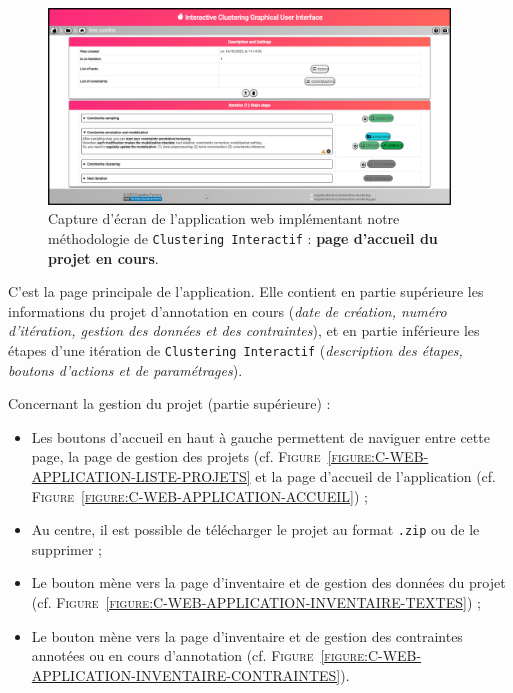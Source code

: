 		\begin{figure}[H]
			\centering
			\includegraphics[width=0.95\textwidth]{figures/interactive-clustering-application-accueil-projet}
			\caption{
				Capture d'écran de l'application web implémentant notre méthodologie de \texttt{Clustering Interactif} : \textbf{page d'accueil du projet en cours}.
			}
			\label{figure:C-WEB-APPLICATION-ACCUEIL-PROJET}
		\end{figure}
		
		C'est la page principale de l'application. Elle contient en partie supérieure les informations du projet d'annotation en cours (\textit{date de création, numéro d'itération, gestion des données et des contraintes}), et en partie inférieure les étapes d'une itération de \texttt{Clustering Interactif} (\textit{description des étapes, boutons d'actions et de paramétrages}).
		
		Concernant la gestion du projet (partie supérieure) :
		\begin{itemize}
			\item Les boutons d'accueil en haut à gauche permettent de naviguer entre cette page, la page de gestion des projets (cf. \textsc{Figure~\ref{figure:C-WEB-APPLICATION-LISTE-PROJETS}} et la page d'accueil de l'application (cf. \textsc{Figure~\ref{figure:C-WEB-APPLICATION-ACCUEIL}}) ;
			\item Au centre, il est possible de télécharger le projet au format \texttt{.zip} ou de le supprimer ;
			\item Le bouton  mène vers la page d'inventaire et de gestion des données du projet (cf. \textsc{Figure~\ref{figure:C-WEB-APPLICATION-INVENTAIRE-TEXTES}}) ;
			\item Le bouton  mène vers la page d'inventaire et de gestion des contraintes annotées ou en cours d'annotation (cf. \textsc{Figure~\ref{figure:C-WEB-APPLICATION-INVENTAIRE-CONTRAINTES}}).
		\end{itemize}
		
